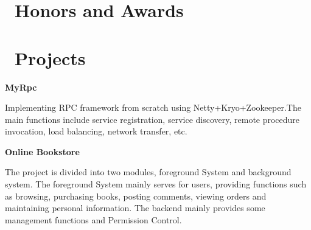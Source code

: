 \documentclass{resume}
\begin{document}
\section{\faHeartO\ Honors and Awards}

\section{\faProjectDiagram \ Projects}
\textbf{MyRpc}


   Implementing RPC framework from scratch using Netty+Kryo+Zookeeper.The main functions include service registration, service discovery, remote procedure invocation, load balancing, network transfer, etc.
   
   
\textbf{Online Bookstore}


   The project is divided into two modules, foreground System and background system. The foreground System mainly serves for users, providing functions such as browsing, purchasing books, posting comments, viewing orders and maintaining personal information. The backend mainly provides some management functions and Permission Control.

%
%
\end{document}
